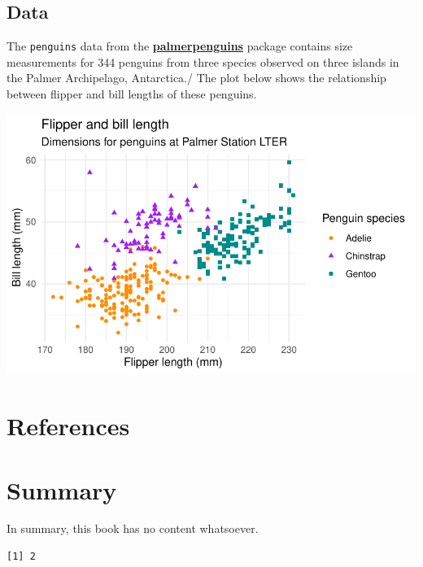 \documentclass[
  a4paper,
]{scrbook}
\newlength{\cslhangindent}
\newlength{\cslentryspacingunit} %
\newenvironment{CSLReferences}[2] %
 {%
  \setlength{\parindent}{0pt}
  \ifodd #1
  \let\oldpar\par
  \def\par{\hangindent=\cslhangindent\oldpar}
  \fi
  \setlength{\parskip}{#2\cslentryspacingunit}
 }%
 {}
\begin{document}
\hypertarget{data}{%
\section{Data}\label{data}}

The \texttt{penguins} data from the
\href{https://allisonhorst.github.io/palmerpenguins}{\textbf{palmerpenguins}}
package contains size measurements for 344 penguins from three species
observed on three islands in the Palmer Archipelago, Antarctica./ The
plot below shows the relationship between flipper and bill lengths of
these penguins.

\includegraphics{./part1_files/figure-pdf/plot-penguins-1.pdf}

\hypertarget{references}{%
\chapter*{References}\label{references}}

\hypertarget{refs}{}
\begin{CSLReferences}{0}{0}
\end{CSLReferences}

\hypertarget{summary-1}{%
\chapter{Summary}\label{summary-1}}

In summary, this book has no content whatsoever.

\begin{verbatim}
[1] 2
\end{verbatim}

\appendix
{}
\end{document}

